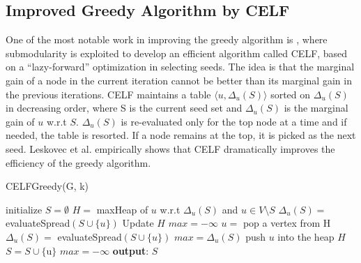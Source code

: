 \documentclass[journal,twoside,web]{ieeecolor}
\begin{document}
\subsection{Improved Greedy Algorithm by CELF}
\label{sec:greedy}
One of the most notable work in improving the greedy algorithm is \cite{Leskovec2007}, where submodularity is exploited to develop an efficient algorithm called CELF, based on a “lazy-forward” optimization in selecting seeds. The idea is that the marginal gain of a node in the current iteration cannot be better than its marginal gain in the previous iterations. CELF maintains a table $\langle u, \Delta_{u}(S) \rangle$ sorted on $\Delta_{u}(S)$ in decreasing order, where S is the current seed set and $\Delta_{u}(S)$ is the marginal gain of $u$ w.r.t $S$. $\Delta_{u}(S)$ is re-evaluated only for the top node at a time and if needed, the table is resorted. If a node remains at the top, it is picked as the next seed. Leskovec et al.\cite{Leskovec2007} empirically shows that CELF dramatically improves the efficiency of the greedy algorithm.
\begin{algorithm}
\caption{CELFGreedy(G, k)}
\label{algorithm:improved-lt}
\begin{algorithmic} [1]
\STATE initialize $S=\emptyset$
\STATE $H =$ maxHeap of $u$ w.r.t $\Delta_{u}(S)$ and $u\in V\setminus S$
\STATE $\Delta_{u}(S) =$ evaluateSpread$(S\cup \{u\})$
\STATE Update $H$
\ENDFOR
\STATE $max = -\infty$
\STATE $u = $ pop a vertex from H
\STATE $\Delta_{u}(S) =$ evaluateSpread$(S\cup \{u\})$
\STATE $max=\Delta_{u}(S) $
\ENDIF
\STATE push $u$ into the heap $H$
\ELSE
\STATE $S = S \cup \{$u$\}$
\STATE $max = -\infty$
\ENDIF
\ENDWHILE
\STATE \textbf{output}: $S$
\end{algorithmic}
\end{algorithm}
\end{document}
